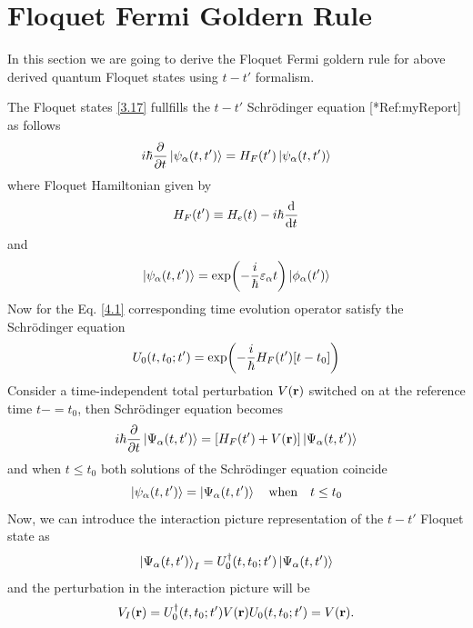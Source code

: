 \section{Floquet Fermi Goldern Rule}

In this section we are going to derive the Floquet Fermi goldern rule for above derived quantum Floquet states using $t-t'$ formalism.

\vspace{5mm}
\noindent
The Floquet states \eqref{3.17} fullfills the $t-t'$ Schrödinger equation [*Ref:myReport] as follows
\begin{equation} \label{4.1}
  i \hbar \pdv{t}\ket{\psi_{\alpha}(t,t')} =
  H_F(t') \ket{\psi_{\alpha}(t,t')}
\end{equation}
where Floquet Hamiltonian given by
\begin{equation} \label{4.2}
  H_F(t') \equiv
  H_e(t) - i\hbar \dv{t}
\end{equation}
and
\begin{equation} \label{4.3}
  \ket{\psi_{\alpha}(t,t')} =
  \exp(-\frac{i}{\hbar}\varepsilon_{\alpha} t)\ket{\phi_{\alpha}(t')}
\end{equation}
Now for the Eq. \eqref{4.1} corresponding time evolution operator satisfy the Schrödinger equation
\begin{equation} \label{4.4}
  U_0(t,t_0;t') = \exp(-\frac{i}{\hbar}H_F(t')\qty[t-t_0])
\end{equation}
Consider a time-independent total perturbation $V(\mathbf{r})$ switched on at the reference time $t-=t_0$, then Schrödinger equation becomes
\begin{equation} \label{4.5}
  i \hbar \pdv{t}\ket{\Psi_{\alpha}(t,t')} =
  \qty[H_F(t') + V(\mathbf{r})]\ket{\Psi_{\alpha}(t,t')}
\end{equation}
and when $t\leq t_0$ both solutions of the Schrödinger equation coincide
\begin{equation} \label{4.6}
  \ket{\psi_{\alpha}(t,t')} =\ket{\Psi_{\alpha}(t,t')} \quad
  \text{when} \quad
  t \leq t_0
\end{equation}
Now, we can introduce the interaction picture representation of the $t-t'$ Floquet state as
\begin{equation} \label{4.7}
  \ket{\Psi_{\alpha}(t,t')}_I = U_0^{\dagger}(t,t_0;t')
  \ket{\Psi_{\alpha}(t,t')}
\end{equation}
and the perturbation in the interaction picture will be
\begin{equation} \label{4.8}
  V_I(\mathbf{r}) = U_0^{\dagger}(t,t_0;t')V(\mathbf{r})U_0(t,t_0;t') =
  V(\mathbf{r}).
\end{equation}
